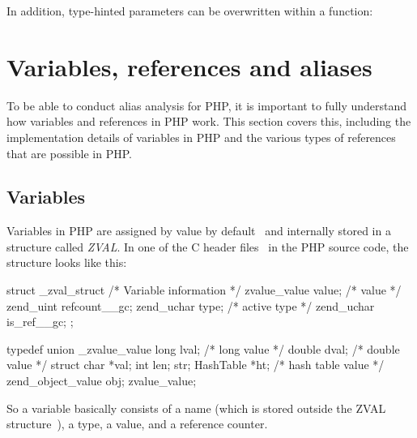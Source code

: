 
In addition, type-hinted parameters can be overwritten within a function:


\section{Variables, references and aliases}

To be able to conduct alias analysis for PHP, it is important to fully understand how variables and references in PHP work. This section covers this, including the implementation details of variables in PHP and the various types of references that are possible in PHP.


\subsection{Variables}

Variables in PHP are assigned by value by default~\cite{php-manual-variables} and internally stored in a structure called \emph{ZVAL}. In one of the C header files~\cite{php-src-api-headers} in the PHP source code, the structure looks like this:

\begin{ccode}
struct _zval_struct {
  /* Variable information */
  zvalue_value value;       /* value */
  zend_uint refcount__gc;
  zend_uchar type;          /* active type */
  zend_uchar is_ref__gc;
};

typedef union _zvalue_value {
  long lval;     /* long value */
  double dval;   /* double value */
  struct {
    char *val;
    int len;
  } str;
  HashTable *ht;  /* hash table value */
  zend_object_value obj;
} zvalue_value;
\end{ccode}

So a variable basically consists of a name (which is stored outside the ZVAL structure~\cite{php-extensions-zval}), a type, a value, and a reference counter.

